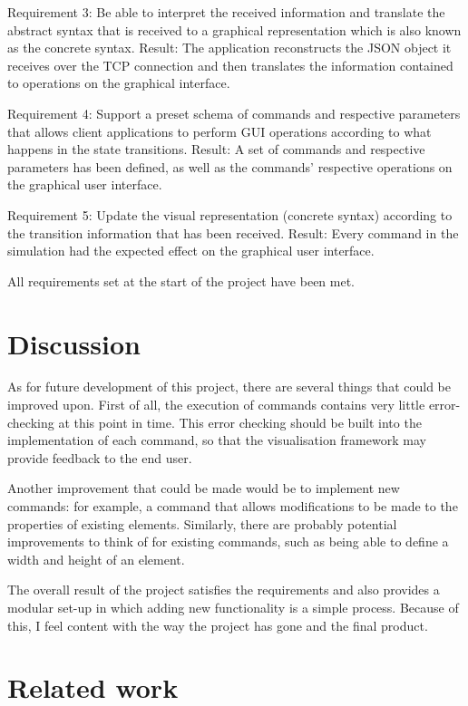 \documentclass[11pt,a4paper]{article}
\begin{document}
Requirement 3: Be able to interpret the received information and translate the abstract syntax that is received to a graphical representation which is also known as the concrete syntax.
Result: The application reconstructs the JSON object it receives over the TCP connection and then translates the information contained to operations on the graphical interface.

Requirement 4: Support a preset schema of commands and respective parameters that allows client applications to perform GUI operations according to what happens in the state transitions.
Result: A set of commands and respective parameters has been defined, as well as the commands' respective operations on the graphical user interface.

Requirement 5: Update the visual representation (concrete syntax) according to the transition information that has been received.
Result: Every command in the simulation had the expected effect on the graphical user interface.

All requirements set at the start of the project have been met.

\section{Discussion}

As for future development of this project, there are several things that could be improved upon. First of all, the execution of commands contains very little error-checking at this point in time. This error checking should be built into the implementation of each command, so that the visualisation framework may provide feedback to the end user.

Another improvement that could be made would be to implement new commands: for example, a command that allows modifications to be made to the properties of existing elements. Similarly, there are probably potential improvements to think of for existing commands, such as being able to define a width and height of an element.

The overall result of the project satisfies the requirements and also provides a modular set-up in which adding new functionality is a simple process. Because of this, I feel content with the way the project has gone and the final product.

\section{Related work}
\end{document}
